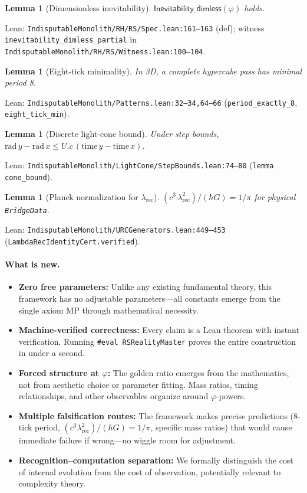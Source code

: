 \documentclass[11pt,a4paper,twoside]{article}
\numberwithin{equation}{section}
\theoremstyle{customthm}
\newtheorem{lemma}[theorem]{Lemma}
\theoremstyle{customdef}
\theoremstyle{customrem}
\begin{document}
\begin{lemma}[Dimensionless inevitability]\label{lem:inevitability}
\(\mathsf{Inevitability\_dimless}(\varphi)\) holds.
\end{lemma}
\noindent Lean: \texttt{IndisputableMonolith/RH/RS/Spec.lean:161--163} (def); witness \texttt{inevitability\_dimless\_partial} in \texttt{IndisputableMonolith/RH/RS/Witness.lean:100--104}.

\begin{lemma}[Eight-tick minimality]\label{lem:eight}
In 3D, a complete hypercube pass has minimal period 8.
\end{lemma}
\noindent Lean: \texttt{IndisputableMonolith/Patterns.lean:32--34,64--66} (\texttt{period\_exactly\_8}, \texttt{eight\_tick\_min}).

\begin{lemma}[Discrete light-cone bound]\label{lem:cone}
Under step bounds, \(\mathrm{rad}\,y - \mathrm{rad}\,x \le U.c\, (\mathrm{time}\,y - \mathrm{time}\,x)\).
\end{lemma}
\noindent Lean: \texttt{IndisputableMonolith/LightCone/StepBounds.lean:74--80} (\texttt{lemma cone\_bound}).

\begin{lemma}[Planck normalization for $\lambda_{\mathrm{rec}}$]\label{lem:planck}
\( (c^3\,\lambda_{\mathrm{rec}}^2)/(\hbar G) = 1/\pi \) for physical \texttt{BridgeData}.
\end{lemma}
\noindent Lean: \texttt{IndisputableMonolith/URCGenerators.lean:449--453} (\texttt{LambdaRecIdentityCert.verified}).

\paragraph{What is new.}
\begin{itemize}
  \item \textbf{Zero free parameters:} Unlike any existing fundamental theory, this framework has no adjustable parameters—all constants emerge from the single axiom MP through mathematical necessity.
  \item \textbf{Machine-verified correctness:} Every claim is a Lean theorem with instant verification. Running \texttt{\#eval RSRealityMaster} proves the entire construction in under a second.
  \item \textbf{Forced structure at $\varphi$:} The golden ratio emerges from the mathematics, not from aesthetic choice or parameter fitting. Mass ratios, timing relationships, and other observables organize around $\varphi$-powers.
  \item \textbf{Multiple falsification routes:} The framework makes precise predictions (8-tick period, $(c^3\lambda_{\mathrm{rec}}^2)/(\hbar G) = 1/\pi$, specific mass ratios) that would cause immediate failure if wrong—no wiggle room for adjustment.
  \item \textbf{Recognition–computation separation:} We formally distinguish the cost of internal evolution from the cost of observation, potentially relevant to complexity theory.
\end{itemize}
\end{document}
